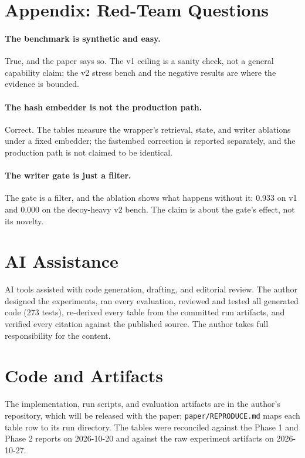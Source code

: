\documentclass[11pt]{article}
\begin{document}
\section*{Appendix: Red-Team Questions}
\paragraph{The benchmark is synthetic and easy.} True, and the paper says so. The v1 ceiling is a sanity check, not a general capability claim; the v2 stress bench and the negative results are where the evidence is bounded.
\paragraph{The hash embedder is not the production path.} Correct. The tables measure the wrapper's retrieval, state, and writer ablations under a fixed embedder; the fastembed correction is reported separately, and the production path is not claimed to be identical.
\paragraph{The writer gate is just a filter.} The gate is a filter, and the ablation shows what happens without it: 0.933 on v1 and 0.000 on the decoy-heavy v2 bench. The claim is about the gate's effect, not its novelty.

\section*{AI Assistance}
AI tools assisted with code generation, drafting, and editorial review. The author designed the experiments, ran every evaluation, reviewed and tested all generated code (273 tests), re-derived every table from the committed run artifacts, and verified every citation against the published source. The author takes full responsibility for the content.

\section*{Code and Artifacts}
The implementation, run scripts, and evaluation artifacts are in the author's repository, which will be released with the paper; \texttt{paper/REPRODUCE.md} maps each table row to its run directory. The tables were reconciled against the Phase 1 and Phase 2 reports on 2026-10-20 and against the raw experiment artifacts on 2026-10-27.
\end{document}
